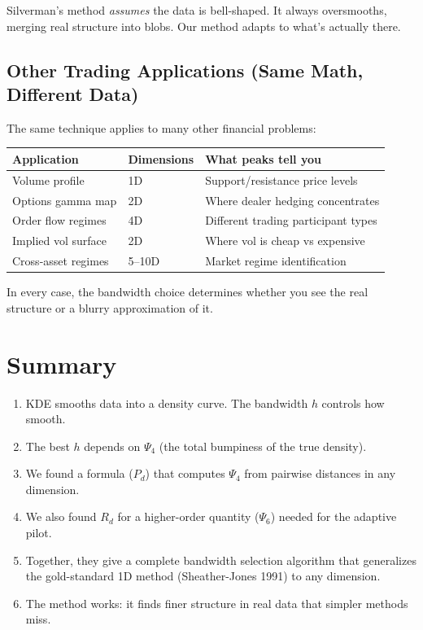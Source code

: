 \documentclass[12pt]{article}
\begin{document}
Silverman's method \textit{assumes} the data is bell-shaped. It always oversmooths, merging real structure into blobs. Our method adapts to what's actually there.

\subsection{Other Trading Applications (Same Math, Different Data)}

The same technique applies to many other financial problems:

\begin{center}
\begin{tabular}{lll}
\toprule
Application & Dimensions & What peaks tell you \\
\midrule
Volume profile & 1D & Support/resistance price levels \\
Options gamma map & 2D & Where dealer hedging concentrates \\
Order flow regimes & 4D & Different trading participant types \\
Implied vol surface & 2D & Where vol is cheap vs expensive \\
Cross-asset regimes & 5--10D & Market regime identification \\
\bottomrule
\end{tabular}
\end{center}

In every case, the bandwidth choice determines whether you see the real structure or a blurry approximation of it.

\section{Summary}

\begin{enumerate}
\item KDE smooths data into a density curve. The bandwidth $h$ controls how smooth.
\item The best $h$ depends on $\Psi_4$ (the total bumpiness of the true density).
\item We found a formula ($P_d$) that computes $\Psi_4$ from pairwise distances in any dimension.
\item We also found $R_d$ for a higher-order quantity ($\Psi_6$) needed for the adaptive pilot.
\item Together, they give a complete bandwidth selection algorithm that generalizes the gold-standard 1D method (Sheather-Jones 1991) to any dimension.
\item The method works: it finds finer structure in real data that simpler methods miss.
\end{enumerate}
\end{document}
